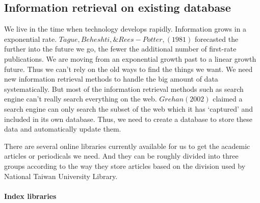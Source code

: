 	
\subsection{Information retrieval on existing database}


We live in the time when technology develops rapidly. Information grows in a exponential rate. $Tague, Beheshti, \& Rees-Potter, (1981)$ forecasted the further into the future we go, the fewer the additional number of first-rate publications. We are moving from an exponential growth past to a linear growth future. Thus we can't rely on the old ways to find the things we want. 
We need new information retrieval methods to handle the big amount of data systematically.
But most of the information retrieval methods such as search engine can't really search everything on the web. 
$Grehan (2002)$ claimed a search engine can only search the subset of the web which it has ‘captured’ and included in its own database. Thus, we need to create a database to store these data and automatically update them.

There are several online libraries currently available for us to get the academic articles or periodicals we need.
And they can be roughly divided into three groups according to the way they store articles based on the division used by National Taiwan University Library.

\paragraph{Index libraries}

